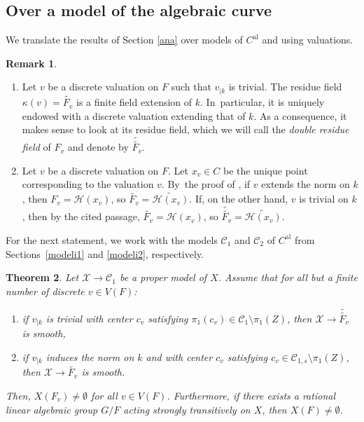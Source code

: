 \documentclass[10pt]{amsart}
\newcommand{\loccit}{the cited passage}
\newcommand{\skpt}{\par\smallskip}
\newcommand{\al}{\mathrm{al}}
\let\backslash\setminus
\newtheorem{thm}{Theorem}[section]
\theoremstyle{definition}
\newtheorem{rem}[thm]{Remark}
\begin{document}
\subsection{Over a model of the algebraic curve}
We translate the results of Section \ref{ana} over models of $C^{\al}$ and using valuations.

\skpt
\begin{rem} \label{3.4}
\begin{enumerate}
\item
Let $v$ be a discrete valuation on $F$ such that $v_{|k}$ is trivial. The residue field $\kappa(v)=\widetilde{F_v}$ is a finite field extension of $k$. In~particular, it is uniquely endowed with a discrete valuation extending that of $k$. As a consequence, it makes sense to look at its residue field, which we will call the \emph{double residue field} of $F_v$ and denote by $\widetilde{\widetilde{F_v}}$.

\item
Let $v$ be a discrete valuation on $F$. Let $x_v \in C$ be the unique point corresponding to the valuation $v$. By~the proof of \cite[Prop.\,3.15]{une}, if $v$ extends the norm on $k$, then $F_v =\mathcal{H}(x_v)$, so $\widetilde{F_v}=\widetilde{\mathcal{H}(x_v)}$. If, on the other hand, $v$ is trivial on $k$, then by \loccit, $\widetilde{F_v}=\mathcal{H}(x_v)$, so $\widetilde{\widetilde{F_v}}=\widetilde{\mathcal{H}(x_v)}$.
\end{enumerate}
\end{rem}

For the next statement, we work with the models $\mathscr{C}_1$ and $\mathscr{C}_2$ of $C^{\al}$ from Sections~\ref{modeli1} and \ref{modeli2}, respectively.

\begin{thm} \label{3.6}
Let $\mathcal{X} \to \mathscr{C}_1$ be a proper model of $X$. Assume that for all \emph{but a finite number} of discrete $v \in V(F)$:
\begin{enumerate}
\item if $v_{|k}$ is trivial with center $c_v$ satisfying $\pi_1(c_v) \in \mathscr{C}_1 \backslash \pi_1(Z)$, then $\mathcal{X} \to \widetilde{\widetilde{F_v}}$ is smooth,
\item if $v_{|k}$ induces the norm on $k$ and with center $c_v$ satisfying $c_v \in \mathscr{C}_{1,s} \backslash \pi_1(Z)$, then $\mathcal{X} \to \widetilde{F_v}$ is smooth.
\end{enumerate}
Then, $X(F_v) \neq \emptyset$ for all $v \in V(F)$.
Furthermore, if there exists a rational linear algebraic group $G/F$ acting strongly transitively on $X$, then $X(F) \neq \emptyset$.
\end{thm}
\end{document}
